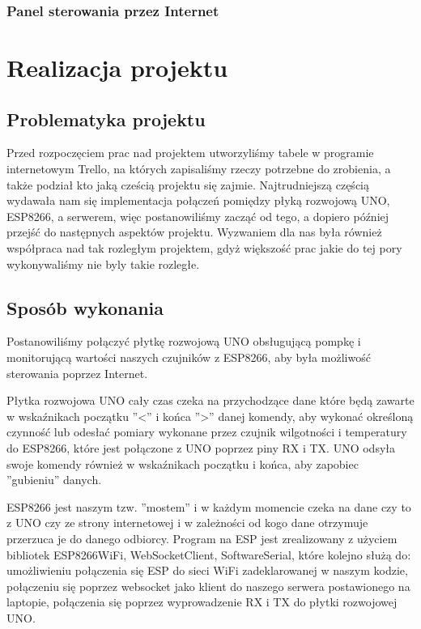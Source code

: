 \documentclass[12pt]{article}
\begin{document}
\newpage
\subsubsection{Panel sterowania przez Internet}

\newpage

\section{Realizacja projektu}
\subsection{Problematyka projektu}
Przed rozpoczęciem prac nad projektem utworzyliśmy tabele w programie internetowym Trello, na których zapisaliśmy rzeczy potrzebne do zrobienia, a także podział kto jaką cześcią projektu się zajmie. Najtrudniejszą częścią wydawała nam się implementacja połączeń pomiędzy płyką rozwojową UNO, ESP8266, a serwerem, więc postanowiliśmy zacząć od tego, a dopiero później przejść do następnych aspektów projektu. Wyzwaniem dla nas była również współpraca nad tak rozległym projektem, gdyż większość prac jakie do tej pory wykonywaliśmy nie byly takie rozległe.

\subsection{Sposób wykonania}


Postanowiliśmy połączyć płytkę rozwojową UNO obsługującą pompkę i monitorującą wartości naszych czujników z ESP8266, aby była możliwość sterowania poprzez Internet.

Płytka rozwojowa UNO cały czas czeka na przychodzące dane które będą zawarte w wskaźnikach początku ''<'' i końca ''>'' danej komendy, aby wykonać określoną czynność lub odesłać pomiary wykonane przez czujnik wilgotności i temperatury do ESP8266, które jest połączone z UNO poprzez piny RX i TX. UNO odsyła swoje komendy również w wskaźnikach początku i końca, aby zapobiec ''gubieniu'' danych.

ESP8266 jest naszym tzw. ''mostem'' i w każdym momencie czeka na dane czy to z UNO czy ze strony internetowej i w zależności od kogo dane otrzymuje przerzuca je do danego odbiorcy.
Program na ESP jest zrealizowany z użyciem bibliotek ESP8266WiFi, WebSocketClient, SoftwareSerial, które kolejno służą do: umożliwieniu połączenia się ESP do sieci WiFi zadeklarowanej w naszym kodzie, połączeniu się poprzez websocket jako klient do naszego serwera postawionego na laptopie, połączenia się poprzez wyprowadzenie RX i TX do płytki rozwojowej UNO.
\end{document}
